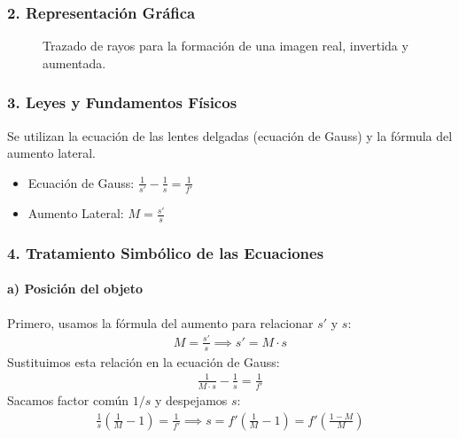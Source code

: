 \subsubsection*{2. Representación Gráfica}
\begin{figure}[H]
    \centering
    \caption{Trazado de rayos para la formación de una imagen real, invertida y aumentada.}
\end{figure}

\subsubsection*{3. Leyes y Fundamentos Físicos}
Se utilizan la ecuación de las lentes delgadas (ecuación de Gauss) y la fórmula del aumento lateral.
\begin{itemize}
    \item Ecuación de Gauss: $\frac{1}{s'} - \frac{1}{s} = \frac{1}{f'}$
    \item Aumento Lateral: $M = \frac{s'}{s}$
\end{itemize}

\subsubsection*{4. Tratamiento Simbólico de las Ecuaciones}
\paragraph*{a) Posición del objeto}
Primero, usamos la fórmula del aumento para relacionar $s'$ y $s$:
\begin{gather}
    M = \frac{s'}{s} \implies s' = M \cdot s
\end{gather}
Sustituimos esta relación en la ecuación de Gauss:
\begin{gather}
    \frac{1}{M \cdot s} - \frac{1}{s} = \frac{1}{f'}
\end{gather}
Sacamos factor común $1/s$ y despejamos $s$:
\begin{gather}
    \frac{1}{s} \left(\frac{1}{M} - 1\right) = \frac{1}{f'} \implies s = f' \left(\frac{1}{M} - 1\right) = f' \left(\frac{1-M}{M}\right)
\end{gather}

